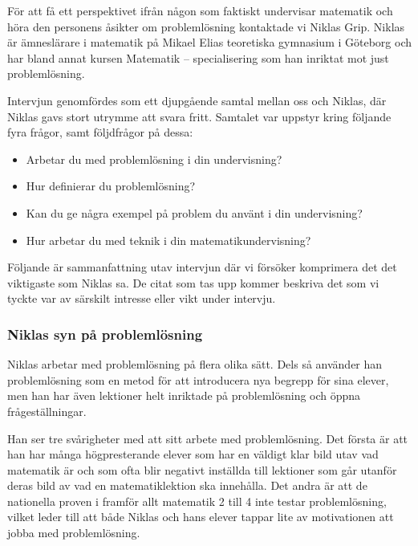 \textcolor{turkos}{
För att få ett perspektivet ifrån någon som faktiskt undervisar matematik och höra den personens åsikter om problemlösning kontaktade vi Niklas Grip. Niklas är ämneslärare i matematik på Mikael Elias teoretiska gymnasium i Göteborg och har bland annat kursen Matematik – specialisering som han inriktat mot just problemlösning.
}

\textcolor{turkos}{
Intervjun genomfördes som ett djupgående samtal mellan oss och Niklas, där Niklas gavs stort utrymme att svara fritt. Samtalet var uppstyr kring följande fyra frågor, samt följdfrågor på dessa: 
}
\begin{itemize}
  \item \textcolor{turkos}{Arbetar du med problemlösning i din undervisning?}
  \item \textcolor{turkos}{Hur definierar du problemlösning?}
  \item \textcolor{turkos}{Kan du ge några exempel på problem du använt i din undervisning?}
  \item \textcolor{turkos}{Hur arbetar du med teknik i din matematikundervisning?}
\end{itemize}

\noindent \textcolor{turkos}{
Följande är sammanfattning utav intervjun där vi försöker komprimera det det viktigaste som Niklas sa. De citat som tas upp kommer beskriva det som vi tyckte var av särskilt intresse eller vikt under intervju. 
}

\subsubsection{Niklas syn på problemlösning}

\textcolor{turkos}{
Niklas arbetar med problemlösning på flera olika sätt. Dels så använder han problemlösning som en metod för att introducera nya begrepp för sina elever, men han har även lektioner helt inriktade på problemlösning och öppna frågeställningar. 
}

\textcolor{turkos}{
Han ser tre svårigheter med att sitt arbete med problemlösning. Det första är att han har många högpresterande elever som har en väldigt klar bild utav vad matematik är och som ofta blir negativt inställda till lektioner som går utanför deras bild av vad en matematiklektion ska innehålla. Det andra är att de nationella proven i framför allt matematik 2 till 4 inte testar problemlösning, vilket leder till att både Niklas och hans elever tappar lite av motivationen att jobba med problemlösning.}

